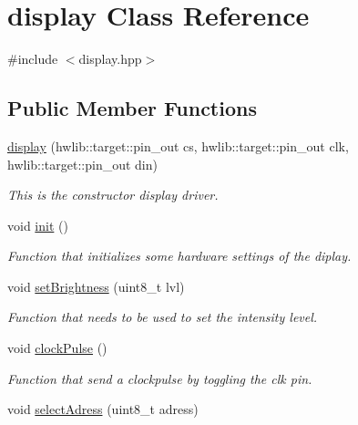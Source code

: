\hypertarget{classdisplay}{}\section{display Class Reference}
\label{classdisplay}


{\ttfamily \#include $<$display.\+hpp$>$}

\subsection*{Public Member Functions}
\begin{DoxyCompactItemize}
\item 
\hyperlink{classdisplay_ac255c97163cd08cc4e6d7a4beeff2b76}{display} (hwlib\+::target\+::pin\+\_\+out cs, hwlib\+::target\+::pin\+\_\+out clk, hwlib\+::target\+::pin\+\_\+out din)
\begin{DoxyCompactList}\small\item\em This is the constructor display driver. \end{DoxyCompactList}\item 
\mbox{\label{classdisplay_aa0b94eb3cb43b47dc720542cf7d1da9b}} 
void \hyperlink{classdisplay_aa0b94eb3cb43b47dc720542cf7d1da9b}{init} ()
\begin{DoxyCompactList}\small\item\em Function that initializes some hardware settings of the diplay. \end{DoxyCompactList}\item 
void \hyperlink{classdisplay_aca4c200063dafafec86cc12d3ca6f2ad}{set\+Brightness} (uint8\+\_\+t lvl)
\begin{DoxyCompactList}\small\item\em Function that needs to be used to set the intensity level. \end{DoxyCompactList}\item 
\mbox{\label{classdisplay_a29bf14b0d1dc4d1d5bdd9df63fae3026}} 
void \hyperlink{classdisplay_a29bf14b0d1dc4d1d5bdd9df63fae3026}{clock\+Pulse} ()
\begin{DoxyCompactList}\small\item\em Function that send a clockpulse by toggling the clk pin. \end{DoxyCompactList}\item 
void \hyperlink{classdisplay_afa66bcce0d701ae771b733bf0d3f9caf}{select\+Adress} (uint8\+\_\+t adress)

\end{DoxyCompactItemize}
